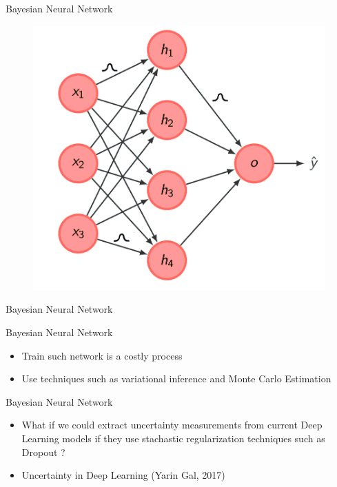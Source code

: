 \documentclass[10pt]{beamer}
\begin{document}
\begin{frame}[fragile]{Bayesian Neural Network}
    \begin{figure}[htp]
        \centering
        \includegraphics[scale=0.3]{images/bayesian_neural_network.png}
    \end{figure}
\end{frame}

\begin{frame}[fragile]{Bayesian Neural Network}
    
\end{frame}

\begin{frame}[fragile]{Bayesian Neural Network}
\begin{itemize}
\item Train such network is a costly process
\vspace{0.5cm}
\item Use techniques such as variational inference and Monte Carlo Estimation
\end{itemize}
\end{frame}

\begin{frame}[fragile]{Bayesian Neural Network}
\begin{itemize}
\item What if we could extract uncertainty measurements from current Deep
    Learning models if they use stachastic regularization techniques such as
        \alert{Dropout} ?
\vspace{0.5cm}
\item Uncertainty in Deep Learning (Yarin Gal, 2017)
\end{itemize}
\end{frame}
\end{document}
